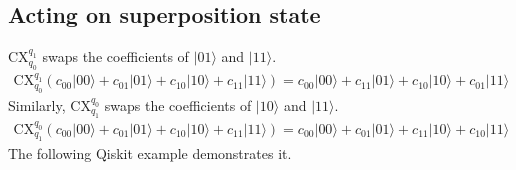 \documentclass[letterpaper,10pt,english]{jupyterBook}
\begin{document}
\subsection{Acting on superposition state}
\label{\detokenize{q2gates/cx:acting-on-superposition-state}}
\sphinxAtStartPar
CX\(_{q_0}^{q_1}\) swaps the coefficients of \(|01\rangle\) and \(|11\rangle\).
\begin{equation*}
\begin{split}
\text{CX}_{q_0}^{q_1} \left (c_{00} |00\rangle + c_{01} |01\rangle + c_{10} |10\rangle + c_{11} |11\rangle \right ) =
c_{00} |00\rangle + c_{11} |01\rangle + c_{10} |10\rangle + c_{01} |11\rangle
\end{split}
\end{equation*}
\sphinxAtStartPar
Similarly, CX\(_{q_1}^{q_0}\) swaps the coefficients of \(|10\rangle\) and \(|11\rangle\).
\begin{equation*}
\begin{split}
\text{CX}_{q_1}^{q_0} \left (c_{00} |00\rangle + c_{01} |01\rangle + c_{10} |10\rangle + c_{11} |11\rangle \right ) =
c_{00} |00\rangle + c_{01} |01\rangle + c_{11} |10\rangle + c_{10} |11\rangle
\end{split}
\end{equation*}
\sphinxAtStartPar
The following Qiskit example demonstrates it.
\end{document}
